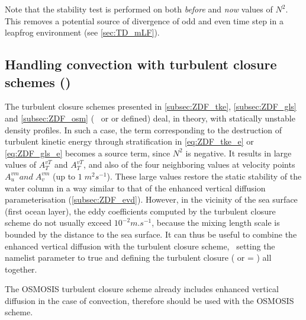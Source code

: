 \documentclass[../main/NEMO_manual]{subfiles}
\begin{document}
Note that the stability test is performed on both \textit{before} and \textit{now} values of $N^2$.
This removes a potential source of divergence of odd and even time step in
a leapfrog environment \citep{leclair_phd10} (see \autoref{sec:TD_mLF}).

\subsection[Handling convection with turbulent closure schemes (\forcode{ln_zdf_}\{\forcode{tke,gls,osm}\})]{Handling convection with turbulent closure schemes ()}
\label{subsec:ZDF_tcs}

The turbulent closure schemes presented in \autoref{subsec:ZDF_tke}, \autoref{subsec:ZDF_gls} and
\autoref{subsec:ZDF_osm} (\ie\  or  or  defined) deal, in theory,
with statically unstable density profiles.
In such a case, the term corresponding to the destruction of turbulent kinetic energy through stratification in
\autoref{eq:ZDF_tke_e} or \autoref{eq:ZDF_gls_e} becomes a source term, since $N^2$ is negative.
It results in large values of $A_T^{vT}$ and  $A_T^{vT}$, and also of the four neighboring values at
velocity points $A_u^{vm} {and}\;A_v^{vm}$ (up to $1\;m^2s^{-1}$).
These large values restore the static stability of the water column in a way similar to that of
the enhanced vertical diffusion parameterisation (\autoref{subsec:ZDF_evd}).
However, in the vicinity of the sea surface (first ocean layer), the eddy coefficients computed by
the turbulent closure scheme do not usually exceed $10^{-2}m.s^{-1}$,
because the mixing length scale is bounded by the distance to the sea surface.
It can thus be useful to combine the enhanced vertical diffusion with the turbulent closure scheme,
\ie\ setting the  namelist parameter to true and
defining the turbulent closure ( or  = ) all together.

The OSMOSIS turbulent closure scheme already includes enhanced vertical diffusion in the case of convection,
therefore  should be used with the OSMOSIS scheme.
\end{document}
